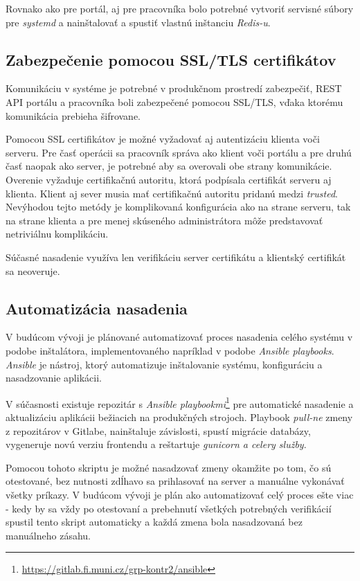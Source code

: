 \documentclass[
  digital, %
  twoside, %
  table,   %
  lof,     %
  lot,     %
]{fithesis3}
\begin{document}
Rovnako ako pre portál, aj pre pracovníka bolo potrebné vytvoriť servisné súbory pre \emph{systemd} a nainštalovať a spustiť vlastnú inštanciu \emph{Redis-u}.


\subsection{Zabezpečenie pomocou SSL/TLS certifikátov}

Komunikáciu v systéme je potrebné v produkčnom prostredí zabezpečiť, REST API portálu a pracovníka boli zabezpečené pomocou SSL/TLS, vďaka ktorému komunikácia prebieha šifrovane. 

Pomocou SSL certifikátov je možné vyžadovať aj autentizáciu klienta voči serveru.
Pre časť operácii sa pracovník správa ako klient voči portálu a pre druhú časť naopak ako server, je potrebné aby sa overovali obe strany komunikácie. Overenie vyžaduje certifikačnú autoritu, ktorá podpísala certifikát serveru aj klienta\cite{RFC2818}. Klient aj sever musia mať certifikačnú autoritu pridanú medzi \emph{trusted}. Nevýhodou tejto metódy je komplikovaná konfigurácia ako na strane serveru, tak na strane klienta a pre menej skúseného administrátora môže predstavovať netriviálnu komplikáciu.

Súčasné nasadenie využíva len verifikáciu server certifikátu a klientský certifikát sa neoveruje.

\subsection{Automatizácia nasadenia}

V budúcom vývoji je plánované automatizovať proces nasadenia celého systému v podobe inštalátora, implementovaného napríklad v podobe \emph{Ansible playbooks}. \emph{Ansible} je nástroj, ktorý automatizuje inštalovanie systému, konfiguráciu a nasadzovanie aplikácii\cite{ansible}. 

V súčasnosti existuje repozitár s \emph{Ansible playbookmi}\footnote{\url{https://gitlab.fi.muni.cz/grp-kontr2/ansible}} pre automatické nasadenie a aktualizáciu aplikácii bežiacich na produkčných strojoch. Playbook \emph{pull-ne} zmeny z repozitárov v Gitlabe, nainštaluje závislosti, spustí migrácie databázy, vygeneruje novú verziu frontendu a reštartuje \emph{gunicorn a celery služby}.

Pomocou tohoto skriptu je možné nasadzovať zmeny okamžite po tom, čo sú otestované, bez nutnosti zdĺhavo sa prihlasovať na server a manuálne vykonávať všetky príkazy. V budúcom vývoji je plán ako automatizovať celý proces ešte viac - kedy by sa vždy po otestovaní a prebehnutí všetkých potrebných verifikácií spustil tento skript automaticky a každá zmena bola nasadzovaná bez manuálneho zásahu.
\end{document}
